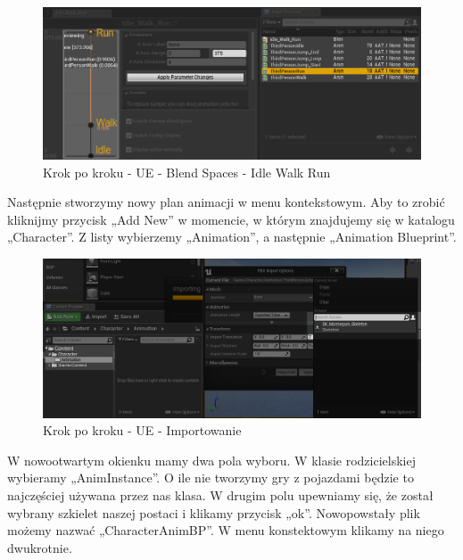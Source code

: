 \documentclass[12pt]{xmgr}
\begin{document}
\begin{figure}[!htb]
    \begin{center}
    \includegraphics[scale=0.5]{Screeny/UeKrokPoKroku/UE-BlendSpace-IdleWalkRun.png}
    \end{center}
    \caption{Krok po kroku - UE - Blend Spaces - Idle Walk Run}
\end{figure}

Następnie stworzymy nowy plan animacji w menu kontekstowym. Aby to zrobić kliknijmy przycisk „Add New” w momencie, w którym znajdujemy się w katalogu „Character”. Z listy wybierzemy „Animation”, a następnie „Animation Blueprint”.

\begin{figure}[!htb]
    \begin{center}
    \includegraphics[scale=0.35]{Screeny/UeKrokPoKroku/UE-Import.png}
    \end{center}
    \caption{Krok po kroku - UE - Importowanie}
\end{figure}

\newpage
W nowootwartym okienku mamy dwa pola wyboru. W klasie rodzicielskiej wybieramy „AnimInstance”. O ile nie tworzymy gry z pojazdami będzie to najczęściej używana przez nas klasa. W drugim polu upewniamy się, że został wybrany szkielet naszej postaci i klikamy przycisk „ok”. Nowopowstały plik możemy nazwać „CharacterAnimBP”. W menu konstektowym klikamy na niego dwukrotnie.
\end{document}
